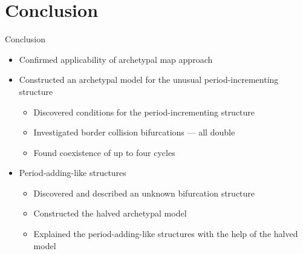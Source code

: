 \section{Conclusion}

\begin{frame}{Conclusion}
	\begin{itemize}
		\item Confirmed applicability of archetypal map approach
		      \pause
		\item Constructed an archetypal model for the unusual period-incrementing structure
		      \begin{itemize}
			      \item Discovered conditions for the period-incrementing structure
			      \item Investigated border collision bifurcations --- all double
			      \item Found coexistence of up to four cycles
		      \end{itemize}
		      \pause
		\item Period-adding-like structures
		      \begin{itemize}
			      \item Discovered and described an unknown bifurcation structure
			      \item Constructed the halved archetypal model
			      \item Explained the period-adding-like structures with the help of the halved model
		      \end{itemize}
	\end{itemize}
\end{frame}
